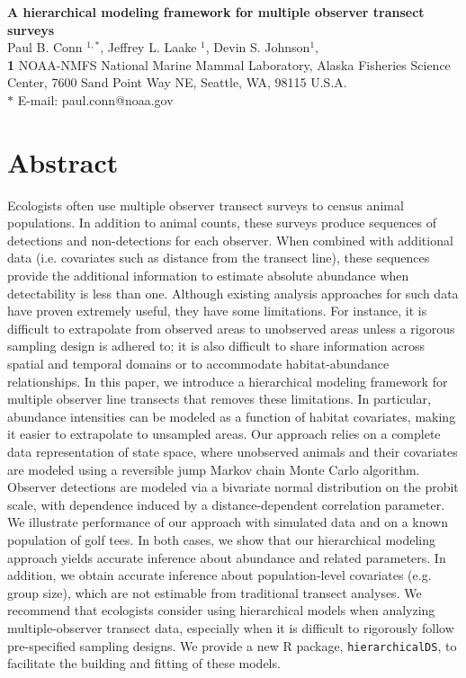 \documentclass[10pt]{article}
\date{}
\begin{document}
\begin{flushleft}
{\Large
\textbf{A hierarchical modeling framework for multiple observer transect surveys} }
\\
Paul B. Conn $^{1,\ast}$,
Jeffrey L. Laake $^{1}$,
Devin S. Johnson$^{1}$,
\\
{\bf{1}} NOAA-NMFS National Marine Mammal Laboratory, Alaska Fisheries Science Center,
7600 Sand Point Way NE, Seattle, WA, 98115 U.S.A.
\\
$\ast$ E-mail: paul.conn@noaa.gov
\end{flushleft}

\section*{Abstract}
Ecologists often use multiple observer transect surveys to census animal populations.  In addition to animal counts, these surveys produce sequences of detections and non-detections for each observer.  When combined with additional data (i.e. covariates such as distance from the transect line), these sequences provide the additional information to estimate absolute abundance when detectability is less than one.  Although existing analysis approaches for such data have proven extremely useful, they have some limitations.  For instance, it is difficult to extrapolate from observed areas to unobserved areas unless a rigorous sampling design is adhered to; it is also difficult to share information across spatial and temporal domains or to accommodate habitat-abundance relationships.  In this paper, we introduce a hierarchical modeling framework for multiple observer line transects that removes these limitations.  In particular, abundance intensities can be modeled as a function of habitat covariates, making it easier to extrapolate to unsampled areas.  Our approach relies on a complete data representation of state space, where unobserved animals and their covariates are modeled using a reversible jump Markov chain Monte Carlo algorithm.  Observer detections are modeled via a bivariate normal distribution on the probit scale, with dependence induced by a distance-dependent correlation parameter.  We illustrate performance of our approach with simulated data and on a known population of golf tees.  In both cases, we show that our hierarchical modeling approach yields accurate inference about abundance and related parameters.  In addition, we obtain accurate inference about population-level covariates (e.g. group size), which are not estimable from traditional transect analyses.  We recommend that ecologists consider using hierarchical models when analyzing multiple-observer transect data, especially when it is difficult to rigorously follow pre-specified sampling designs.  We provide a new R package, {\tt hierarchicalDS}, to facilitate the building and fitting of these models.
\end{document}
